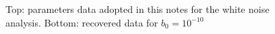 \documentclass[ fontsize=11pt]{scrartcl} %
\numberwithin{equation}{section} %
\numberwithin{figure}{section} %
\numberwithin{table}{section} %
\begin{document}
\begin{figure}[hbtp]
\centering
\caption{Top: parameters data adopted in this notes for the white noise analysis. Bottom: recovered data for $b_0=10^{-10}$}
\label{white_par}
\end{figure}
\end{document}
